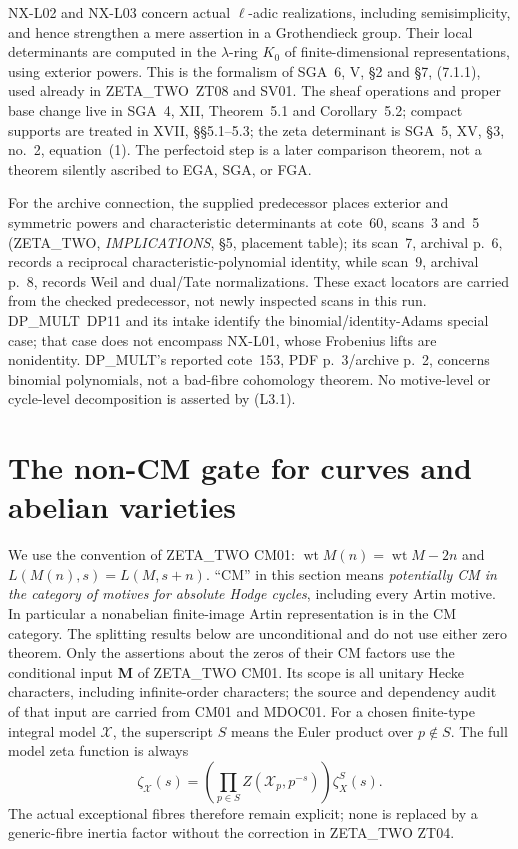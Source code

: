 \documentclass[11pt]{article}
\theoremstyle{remark}
\begin{document}
NX-L02 and NX-L03 concern actual $\ell$-adic realizations, including
semisimplicity, and hence strengthen a mere assertion in a
Grothendieck group.  Their local determinants are computed in the
$\lambda$-ring $K_0$ of finite-dimensional representations, using
exterior powers.  This is the formalism of SGA~6, V, \S2 and
\S7, (7.1.1), used already in ZETA\_TWO~ZT08 and SV01.  The sheaf
operations and proper base change live in SGA~4, XII, Theorem~5.1
and Corollary~5.2; compact supports are treated in XVII, \S\S5.1--5.3;
the zeta determinant is SGA~5, XV, \S3, no.~2, equation~(1).
The perfectoid step is a later comparison theorem, not a theorem
silently ascribed to EGA, SGA, or FGA.

For the archive connection, the supplied predecessor places exterior
and symmetric powers and characteristic determinants at cote~60,
scans~3 and~5 (ZETA\_TWO, \emph{IMPLICATIONS}, \S5, placement table);
its scan~7, archival p.~6, records a reciprocal characteristic-polynomial
identity, while scan~9, archival p.~8, records Weil and dual/Tate
normalizations.  These exact locators are carried from the checked
predecessor, not newly inspected scans in this run.  DP\_MULT~DP11
and its intake identify the binomial/identity-Adams special case;
that case does not encompass NX-L01, whose Frobenius lifts are
nonidentity.  DP\_MULT's reported cote~153, PDF p.~3/archive p.~2,
concerns binomial polynomials, not a bad-fibre cohomology theorem.
No motive-level or cycle-level decomposition is asserted by (L3.1).



\section{The non-CM gate for curves and abelian varieties}
\label{sec:noncm-gate-next}

We use the convention of ZETA\_TWO CM01:
$\operatorname{wt} M(n)=\operatorname{wt}M-2n$ and
$L(M(n),s)=L(M,s+n)$.  ``CM'' in this section means
\emph{potentially CM in the category of motives for absolute Hodge
cycles}, including every Artin motive.  In particular a nonabelian
finite-image Artin representation is in the CM category.  The splitting
results below are unconditional and do not use either zero theorem.
Only the assertions about the zeros of their CM factors use the
conditional input \textbf{M} of ZETA\_TWO CM01.  Its scope is all unitary
Hecke characters, including infinite-order characters; the source and
dependency audit of that input are carried from CM01 and MDOC01.
For a chosen finite-type integral model $\mathcal X$, the superscript
$S$ means the Euler product over $p\notin S$.  The full model zeta
function is always
\[
 \zeta_{\mathcal X}(s)=
       \left(\prod_{p\in S}Z(\mathcal X_p,p^{-s})\right)
                                  \zeta_X^S(s).
\]
The actual exceptional fibres therefore remain explicit; none is
replaced by a generic-fibre inertia factor without the correction in
ZETA\_TWO ZT04.
\end{document}
